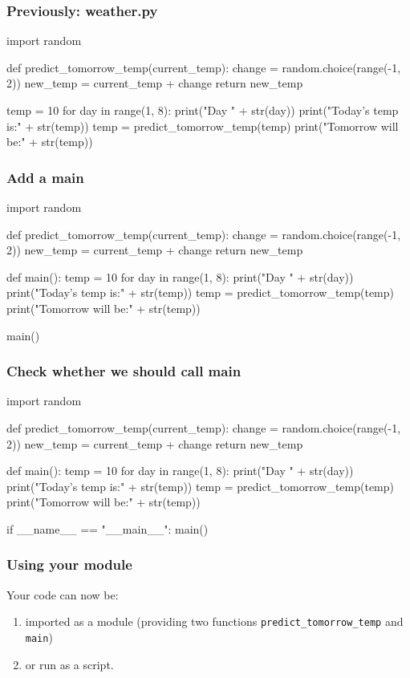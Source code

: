 \documentclass{beamer}
\begin{document}
\begin{frame}[fragile]
\frametitle{Previously: weather.py}
\begin{code} 
import random

def predict_tomorrow_temp(current_temp):
   change = random.choice(range(-1, 2))
   new_temp = current_temp + change
   return new_temp

temp = 10
for day in range(1, 8):
   print("Day " + str(day))
   print("Today's temp is:" + str(temp))
   temp = predict_tomorrow_temp(temp)
   print("Tomorrow will be:" + str(temp))
\end{code}
\end{frame}


\begin{frame}[fragile]
\frametitle{Add a main}
\begin{code} 
import random

def predict_tomorrow_temp(current_temp):
   change = random.choice(range(-1, 2))
   new_temp = current_temp + change
   return new_temp

def main():
   temp = 10
   for day in range(1, 8):
      print("Day " + str(day))
      print("Today's temp is:" + str(temp))
      temp = predict_tomorrow_temp(temp)
      print("Tomorrow will be:" + str(temp))

main()
\end{code}
\end{frame}

\begin{frame}[fragile]
\frametitle{Check whether we should call main}
\begin{code} 
import random

def predict_tomorrow_temp(current_temp):
   change = random.choice(range(-1, 2))
   new_temp = current_temp + change
   return new_temp

def main():
   temp = 10
   for day in range(1, 8):
      print("Day " + str(day))
      print("Today's temp is:" + str(temp))
      temp = predict_tomorrow_temp(temp)
      print("Tomorrow will be:" + str(temp))

if __name__ == "__main__":
   main()
\end{code}
\end{frame}

\begin{frame}[fragile]
\frametitle{Using your module}
Your code can now be:
\begin{enumerate}
\item imported as a module (providing two functions
\texttt{predict\_tomorrow\_temp} and \texttt{main}) 
\item or run as a script.
\end{enumerate}
\end{frame}
\end{document}
